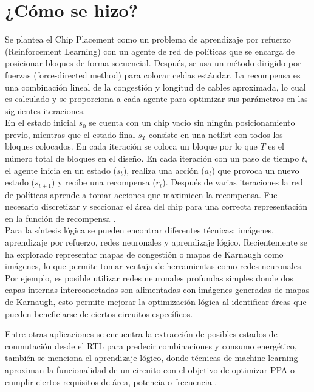 \documentclass[journal]{IEEEtran}
\begin{document}
\section{¿Cómo se hizo?}
Se plantea el Chip Placement como un problema de aprendizaje por refuerzo (Reinforcement Learning) con un agente de red de políticas que se encarga de posicionar bloques de forma secuencial. Después, se usa un método dirigido por fuerzas (force-directed method) para colocar celdas estándar. La recompensa es una combinación lineal de la congestión y longitud de cables aproximada, lo cual es calculado y se proporciona a cada agente para optimizar sus parámetros en las siguientes iteraciones.\\

En el estado inicial $ s_0 $ se cuenta con un chip vacío sin ningún posicionamiento previo, mientras que el estado final $ s_T $ consiste en una netlist con todos los bloques colocados. En cada iteración se coloca un bloque por lo que $ T $ es el número total de bloques en el diseño. En cada iteración con un paso de tiempo $ t $, el agente inicia en un estado ($s_t$), realiza una acción ($a_t$) que provoca un nuevo estado ($s_{t+1}$) y recibe una recompensa ($r_t$). Después de varias iteraciones la red de políticas aprende a tomar acciones que maximicen la recompensa. Fue necesario discretizar y seccionar el área del chip para una correcta representación en la función de recompensa \cite{mirhoseini2020chip}.\\

Para la síntesis lógica se pueden encontrar diferentes técnicas: imágenes, aprendizaje por refuerzo, redes neuronales y aprendizaje lógico. Recientemente se ha explorado representar mapas de congestión o mapas de Karnaugh como imágenes, lo que permite tomar ventaja de herramientas como redes neuronales. Por ejemplo, es posible utilizar redes neuronales profundas simples donde dos capas internas interconectadas son alimentadas con imágenes generadas de mapas de Karnaugh, esto permite mejorar la optimización lógica al identificar áreas que pueden beneficiarse de ciertos circuitos específicos.

Entre otras aplicaciones se encuentra la extracción de posibles estados de conmutación desde el RTL para predecir combinaciones y consumo energético, también se menciona el aprendizaje lógico, donde técnicas de machine learning aproximan la funcionalidad de un circuito con el objetivo de optimizar PPA o cumplir ciertos requisitos de área, potencia o frecuencia \cite{logic_synthesis}.
\end{document}
